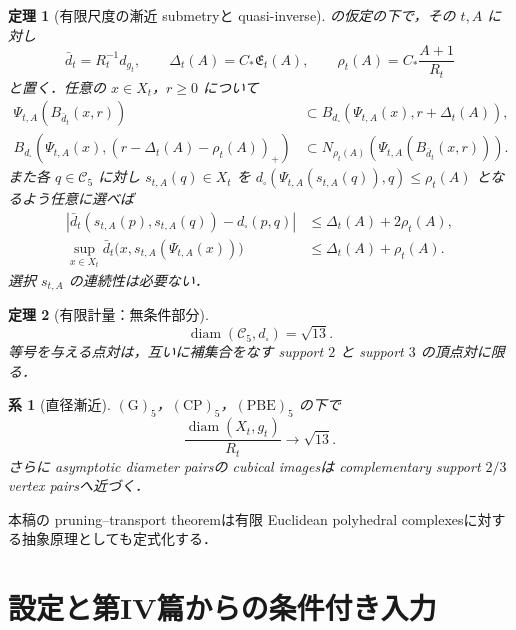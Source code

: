 \documentclass[a4paper,11pt]{ltjsarticle}
\numberwithin{equation}{section}
\theoremstyle{plain}
\newtheorem{theorem}{定理}[section]
\newtheorem{corollary}[corollary]{系}
\theoremstyle{definition}
\theoremstyle{remark}
\newcommand{\cC}{\mathcal C}
\newcommand{\diam}{\operatorname{diam}}
\begin{document}
\begin{theorem}[有限尺度の漸近 submetryと quasi-inverse]\label{thm:intro-submetry}
 の仮定の下で，その $t,A$ に対し
\[
 \bar d_t=R_t^{-1}d_{g_t},\qquad
 \Delta_t(A)=C_*\mathfrak E_t(A),\qquad
 \rho_t(A)=C_*\frac{A+1}{R_t}
\]
と置く．任意の $x\in X_t$，$r\ge0$ について
\begin{align}
 \Psi_{t,A}(B_{\bar d_t}(x,r))
 &\subset B_{d_\square}(\Psi_{t,A}(x),r+\Delta_t(A)),\label{eq:intro-submetry-upper}\\
 B_{d_\square}(\Psi_{t,A}(x),(r-\Delta_t(A)-\rho_t(A))_+)
 &\subset N_{\rho_t(A)}\!\left(\Psi_{t,A}(B_{\bar d_t}(x,r))\right).
 \label{eq:intro-submetry-lower}
\end{align}
また各 $q\in\cC_5$ に対し $s_{t,A}(q)\in X_t$ を
$d_\square(\Psi_{t,A}(s_{t,A}(q)),q)\le\rho_t(A)$ となるよう任意に選べば
\begin{align}
 \left|\bar d_t(s_{t,A}(p),s_{t,A}(q))-d_\square(p,q)\right|
 &\le\Delta_t(A)+2\rho_t(A),\label{eq:intro-quasi-inverse-dist}\\
 \sup_{x\in X_t}\bar d_t\bigl(x,s_{t,A}(\Psi_{t,A}(x))\bigr)
 &\le\Delta_t(A)+\rho_t(A).\label{eq:intro-quasi-inverse-section}
\end{align}
選択 $s_{t,A}$ の連続性は必要ない．
\end{theorem}

\begin{theorem}[有限計量：無条件部分]\label{thm:intro-diameter-C5}
\begin{equation}\label{eq:intro-diam-C5}
 \diam(\cC_5,d_\square)=\sqrt{13}.
\end{equation}
等号を与える点対は，互いに補集合をなす support $2$ と support $3$ の頂点対に限る．
\end{theorem}

\begin{corollary}[直径漸近]\label{cor:intro-diameter}
$\mathrm{(G)}_5$，$\mathrm{(CP)}_5$，$\mathrm{(PBE)}_5$ の下で
\begin{equation}\label{eq:intro-diam-asymptotic}
 \frac{\diam(X_t,g_t)}{R_t}\longrightarrow\sqrt{13}.
\end{equation}
さらに asymptotic diameter pairsの cubical imagesは complementary support $2/3$ vertex pairsへ近づく．
\end{corollary}


本稿の pruning--transport theoremは有限 Euclidean polyhedral complexesに対する抽象原理としても定式化する．
\section{設定と第IV篇からの条件付き入力}\label{sec:inputs}
\end{document}
